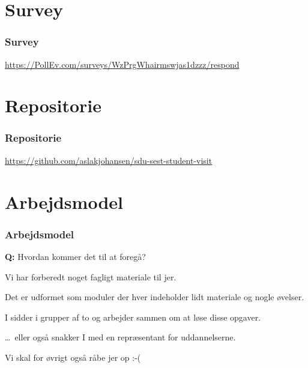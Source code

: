 \section{Survey}
\begin{frame}
    \frametitle{Survey}
    \begin{center}
    
      \vspace{4mm}
      \url{https://PollEv.com/surveys/WzPrgWhairmswjas1dzzz/respond}
    \end{center}
\end{frame}


\section{Repositorie}
\begin{frame}
    \frametitle{Repositorie}
    \begin{center}
      \url{https://github.com/aslakjohansen/sdu-sest-student-visit}
    \end{center}
\end{frame}

\section{Arbejdsmodel}
\begin{frame}
  \frametitle{Arbejdsmodel}
  \vspace{3mm}
  \textbf{Q:} Hvordan kommer det til at foregå?
  
  \pause
  \vspace{5mm}
  Vi har forberedt noget fagligt materiale til jer.
  
  \vspace{5mm}
  Det er udformet som moduler der hver indeholder lidt materiale og nogle øvelser.
  
  \vspace{5mm}
  I sidder i grupper af to og arbejder sammen om at løse disse opgaver.
  
  \pause
  \vspace{5mm}
  \ldots\ eller også snakker I med en repræsentant for uddannelserne.
  
  \pause
  \vspace{5mm}
  Vi skal for øvrigt også råbe jer op :-(
\end{frame}

